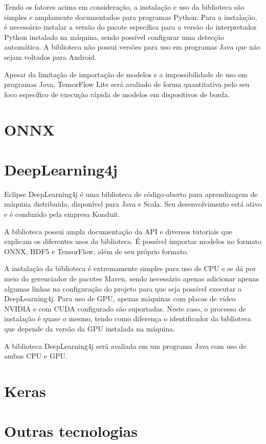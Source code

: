 Tendo os fatores acima em consideração, a instalação e uso da biblioteca são simples e amplamente documentados para programas Python. Para a instalação, é necessário instalar a versão do pacote específica para a versão do interpretador Python instalado na máquina, sendo possível configurar uma detecção automática. A biblioteca não possui versões para uso em programas Java que não sejam voltados para Android.

Apesar da limitação de importação de modelos e a impossibilidade de uso em programas Java, TensorFlow Lite será avaliado de forma quantitativa pelo seu foco específico de execução rápida de modelos em dispositivos de borda.

\section{ONNX}

\section{DeepLearning4j}

Eclipse DeepLearning4j \cite{ml_site_deeplearning4j} é uma biblioteca de código-aberto para aprendizagem de máquina distribuída, disponível para Java e Scala. Seu desenvolvimento está ativo e é conduzido pela empresa Konduit.

A biblioteca possui ampla documentação da API e diversos tutoriais que explicam os diferentes usos da biblioteca. É possível importar modelos no formato ONNX, HDF5 e TensorFlow, além de seu próprio formato.

A instalação da biblioteca é extremamente simples para uso de CPU e se dá por meio do gerenciador de pacotes Maven, sendo necessário apenas adicionar apenas algumas linhas na configuração do projeto para que seja possível executar o DeepLearning4j. Para uso de GPU, apenas máquinas com placas de vídeo NVIDIA e com CUDA configurado são suportadas. Neste caso, o processo de instalação é quase o mesmo, tendo como diferença o identificador da biblioteca que depende da versão da GPU instalada na máquina.

A biblioteca DeepLearning4j será avaliada em um programa Java com uso de ambas CPU e GPU.

\section{Keras}

\section{Outras tecnologias}


